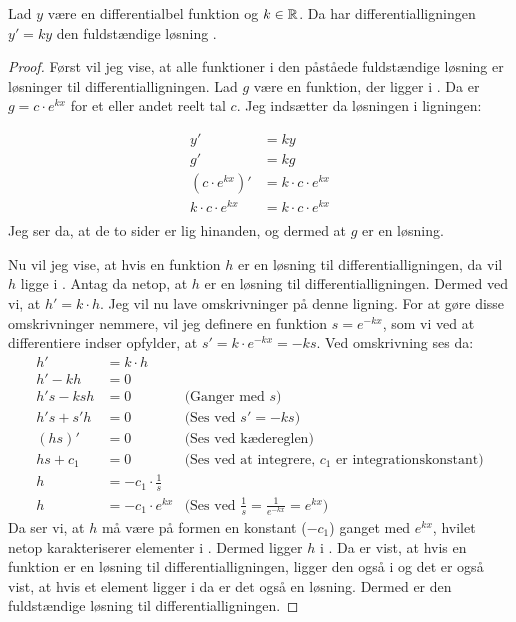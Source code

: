 \begin{thm}\label{thm:y'=k*y}
Lad $y$ være en differentialbel funktion og $k\in \mathbb{R}$. Da har  differentialligningen $y' = ky$ den fuldstændige løsning \LosEks.
\end{thm}
\begin{proof}
Først vil jeg vise, at alle funktioner i den påståede fuldstændige løsning er løsninger til differentialligningen.
Lad $g$ være en funktion, der ligger i \LosEks .
Da er $g=c\cdot e^{kx}$ for et eller andet reelt tal $c$.
Jeg indsætter da løsningen i ligningen: 

\begin{align*}
y' &= ky\\
g' &= kg\\
(c\cdot e^{kx})' &= k\cdot c\cdot e^{kx}\\
k\cdot c\cdot e^{kx} &= k\cdot c\cdot e^{kx}\\
\end{align*}
Jeg ser da, at de to sider er lig hinanden, og dermed at $g$ er en løsning. 

Nu vil jeg vise, at hvis en funktion $h$ er en løsning til differentialligningen, da vil $h$ ligge i \LosEks.
Antag da netop, at $h$ er en løsning til differentialligningen. 
Dermed ved vi, at $h'=k\cdot h$.
Jeg vil nu lave omskrivninger på denne ligning. 
For at gøre disse omskrivninger nemmere, vil jeg definere en funktion $s=e^{-kx}$, som vi ved at differentiere indser opfylder, at $s'=k \cdot e^{-kx} = -ks$.
Ved omskrivning ses da:
\begin{align*}
h'&=k\cdot h \\
h'-kh &= 0\\
h's-ksh&=0 		& \text{(Ganger med }s\text{)}\\
h's+s'h&=0		& \text{(Ses ved $s'=-ks$)}\\
(hs)'&=0		&\text{(Ses ved kædereglen)}\\
hs+c_1 &= 0		&\text{(Ses ved at integrere, $c_1$ er integrationskonstant)}\\
h&= -c_1 \cdot \frac{1}{s}\\
h&= -c_1 \cdot e^{kx} &\text{(Ses ved $\frac{1}{s}=\frac{1}{e^{-kx}} = e^{kx}$)}
\end{align*}
Da ser vi, at $h$ må være på formen en konstant ($-c_1$) ganget med $e^{kx}$, hvilet netop karakteriserer elementer i \LosEks. 
Dermed ligger $h$ i \LosEks.
Da er vist, at hvis en funktion er en løsning til differentialligningen, ligger den også i \LosEks og det er også vist, at hvis et element ligger i \LosEks\text{,} da er det også en løsning. 
Dermed er \LosEks\text{} den fuldstændige løsning til differentialligningen. 
\end{proof}